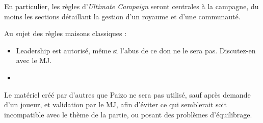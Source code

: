 \documentclass[letterpaper,10pt,twoside,twocolumn,openany]{book}
\begin{document}
En particulier, les règles d'\textit{Ultimate Campaign} seront centrales à la campagne, du moins les sections détaillant la gestion d'un royaume et d'une communauté.

Au sujet des règles maisons classiques : 
\begin{itemize}
    \item Leadership est autorisé, même si l'abus de ce don ne le sera pas. Discutez-en avec le MJ.
    \item 
\end{itemize}

Le matériel créé par d'autres que Paizo ne sera pas utilisé, sauf après demande d'un joueur, et validation par le MJ, afin d'éviter ce qui semblerait soit incompatible avec le thème de la partie, ou posant des problèmes d'équilibrage.
\end{document}
